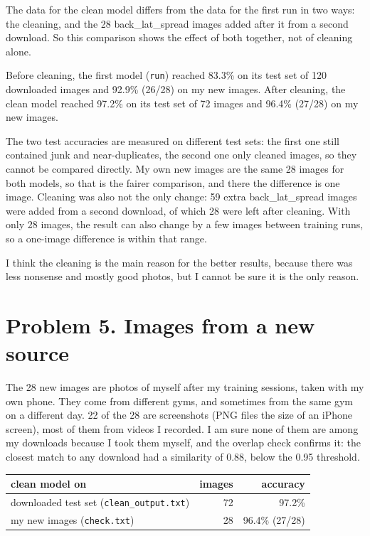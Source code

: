\documentclass[11pt]{article}
\begin{document}
The data for the clean model differs from the data for the first run in two
ways: the cleaning, and the 28 back\_lat\_spread images added after it from a
second download. So this comparison shows the effect of both together, not of
cleaning alone.

Before cleaning, the first model (\texttt{run}) reached 83.3\% on its test set of 120 downloaded images and 92.9\% (26/28) on my new images. After cleaning, the clean model reached 97.2\% on its test set of 72 images and 96.4\% (27/28) on my new images.

The two test accuracies are measured on different test sets: the first one still contained junk and near-duplicates, the second one only cleaned images, so they cannot be compared directly. My own new images are the same 28 images for both models, so that is the fairer comparison, and there the difference is one image. Cleaning was also not the only change: 59 extra back\_lat\_spread images were added from a second download, of which 28 were left after cleaning. With only 28 images, the result can also change by a few images between training runs, so a one-image difference is within that range.

I think the cleaning is the main reason for the better results, because there was less nonsense and mostly good photos, but I cannot be sure it is the only reason.

\section*{Problem 5. Images from a new source}

The 28 new images are photos of myself after my training sessions, taken with my own phone. They come from different gyms, and sometimes from the same gym on a different day. 22 of the 28 are screenshots (PNG files the size of an iPhone screen), most of them from videos I recorded. I am sure none of them are among my downloads because I took them myself, and the overlap check confirms it: the closest match to any download had a similarity of 0.88, below the 0.95 threshold.


\begin{center}
\begin{tabular}{lrr}
\toprule
clean model on & images & accuracy \\
\midrule
downloaded test set (\texttt{clean\_output.txt}) & 72 & 97.2\% \\
my new images (\texttt{check.txt}) & 28 & 96.4\% (27/28) \\
\bottomrule
\end{tabular}
\end{center}
\end{document}
